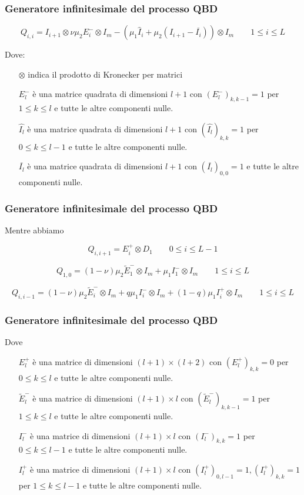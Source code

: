 \documentclass{beamer}
\begin{document}
\begin{frame}
    \frametitle{Generatore infinitesimale del processo QBD}
    \begin{block}{}
        $$ Q_{i,i} = I_{i+1} \otimes \nu \mu_2 E_i^{-} \otimes I_m - (\mu_1 \widehat{I}_i + \mu_2 (I_{i+1} - \overline{I_i})) \otimes I_m \qquad 1 \leq i \leq L$$
    \end{block}
    Dove:
    \begin{itemize}
        \item [$\otimes$] indica il prodotto di Kronecker per matrici
        \item [$E_l^-$] è una matrice quadrata di dimensioni $l+1$ con $(E_l^-)_{k,k-1} = 1$ per $1 \leq k \leq l$ e tutte le altre componenti nulle.
        \item [$\widehat{I_l}$] è una matrice quadrata di dimensioni $l+1$ con $(\widehat{I_l})_{k,k} = 1$ per $0 \leq k \leq l-1$ e tutte le altre componenti nulle.
        \item [$\overline{I_l}$] è una matrice quadrata di dimensioni $l+1$ con $(\overline{I_l})_{0,0} = 1$ e tutte le altre componenti nulle.
    \end{itemize}
\end{frame}


\begin{frame}
    \frametitle{Generatore infinitesimale del processo QBD}
    Mentre abbiamo
    \begin{block}{}
        $$ Q_{i,i+1} = E_i^+ \otimes D_1 \qquad 0 \leq i \leq L-1 $$
    \end{block}
    \begin{block}{}
        $$ Q_{1,0} = (1-\nu) \mu_2 \widetilde{E}_1^- \otimes I_m + \mu_1 I_1^- \otimes I_m \qquad 1 \leq i \leq L $$
    \end{block}
    \begin{block}{}
        $$ Q_{i,i-1} = (1-\nu) \mu_2 \widetilde{E}_i^- \otimes I_m + q \mu_1 I_i^- \otimes I_m + (1-q) \mu_1 I_i^+ \otimes I_m \qquad 1 \leq i \leq L $$
    \end{block}
\end{frame}


\begin{frame}
    \frametitle{Generatore infinitesimale del processo QBD}
    Dove
    \begin{itemize}
        \item [$E_l^+$] è una matrice di dimensioni $(l+1) \times (l+2)$ con $(E_l^+)_{k,k} = 0$ per $0 \leq k \leq l$ e tutte le altre componenti nulle.
        \item [$\widetilde{E}_l^-$] è una matrice di dimensioni $(l+1) \times l$ con $(\widetilde{E}_l^-)_{k,k-1} = 1$ per $1 \leq k \leq l$ e tutte le altre componenti nulle.
        \item [$I_l^-$] è una matrice di dimensioni $(l+1) \times l$ con $(I_l^-)_{k,k} = 1$ per $0 \leq k \leq l-1$ e tutte le altre componenti nulle.
        \item [$I_l^+$] è una matrice di dimensioni $(l+1) \times l$ con  $(I_l^+)_{0,l-1} = 1, (I_l^+)_{k,k} = 1$ per $1 \leq k \leq l-1$ e tutte le altre componenti nulle.
    \end{itemize}
\end{frame}
\end{document}
